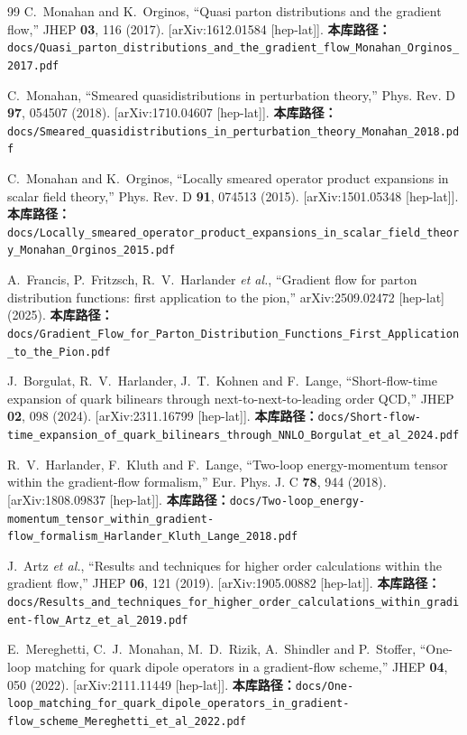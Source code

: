 \documentclass[12pt,a4paper]{ctexart}
\theoremstyle{definition}
\begin{document}
\begin{thebibliography}{99}
C.~Monahan and K.~Orginos,
``Quasi parton distributions and the gradient flow,''
JHEP \textbf{03}, 116 (2017).
[arXiv:1612.01584 [hep-lat]].
\textbf{本库路径：}\texttt{docs/Quasi\_parton\_distributions\_and\_the\_gradient\_flow\_Monahan\_Orginos\_2017.pdf}

C.~Monahan,
``Smeared quasidistributions in perturbation theory,''
Phys. Rev. D \textbf{97}, 054507 (2018).
[arXiv:1710.04607 [hep-lat]].
\textbf{本库路径：}\texttt{docs/Smeared\_quasidistributions\_in\_perturbation\_theory\_Monahan\_2018.pdf}

C.~Monahan and K.~Orginos,
``Locally smeared operator product expansions in scalar field theory,''
Phys. Rev. D \textbf{91}, 074513 (2015).
[arXiv:1501.05348 [hep-lat]].
\textbf{本库路径：}\texttt{docs/Locally\_smeared\_operator\_product\_expansions\_in\_scalar\_field\_theory\_Monahan\_Orginos\_2015.pdf}

A.~Francis, P.~Fritzsch, R.~V.~Harlander \textit{et al.},
``Gradient flow for parton distribution functions: first application to the pion,''
arXiv:2509.02472 [hep-lat] (2025).
\textbf{本库路径：}\texttt{docs/Gradient\_Flow\_for\_Parton\_Distribution\_Functions\_First\_Application\_to\_the\_Pion.pdf}

J.~Borgulat, R.~V.~Harlander, J.~T.~Kohnen and F.~Lange,
``Short-flow-time expansion of quark bilinears through next-to-next-to-leading order QCD,''
JHEP \textbf{02}, 098 (2024).
[arXiv:2311.16799 [hep-lat]].
\textbf{本库路径：}\texttt{docs/Short-flow-time\_expansion\_of\_quark\_bilinears\_through\_NNLO\_Borgulat\_et\_al\_2024.pdf}

R.~V.~Harlander, F.~Kluth and F.~Lange,
``Two-loop energy-momentum tensor within the gradient-flow formalism,''
Eur. Phys. J. C \textbf{78}, 944 (2018).
[arXiv:1808.09837 [hep-lat]].
\textbf{本库路径：}\texttt{docs/Two-loop\_energy-momentum\_tensor\_within\_gradient-flow\_formalism\_Harlander\_Kluth\_Lange\_2018.pdf}

J.~Artz \textit{et al.},
``Results and techniques for higher order calculations within the gradient flow,''
JHEP \textbf{06}, 121 (2019).
[arXiv:1905.00882 [hep-lat]].
\textbf{本库路径：}\texttt{docs/Results\_and\_techniques\_for\_higher\_order\_calculations\_within\_gradient-flow\_Artz\_et\_al\_2019.pdf}

E.~Mereghetti, C.~J.~Monahan, M.~D.~Rizik, A.~Shindler and P.~Stoffer,
``One-loop matching for quark dipole operators in a gradient-flow scheme,''
JHEP \textbf{04}, 050 (2022).
[arXiv:2111.11449 [hep-lat]].
\textbf{本库路径：}\texttt{docs/One-loop\_matching\_for\_quark\_dipole\_operators\_in\_gradient-flow\_scheme\_Mereghetti\_et\_al\_2022.pdf}


\end{thebibliography}
\end{document}
